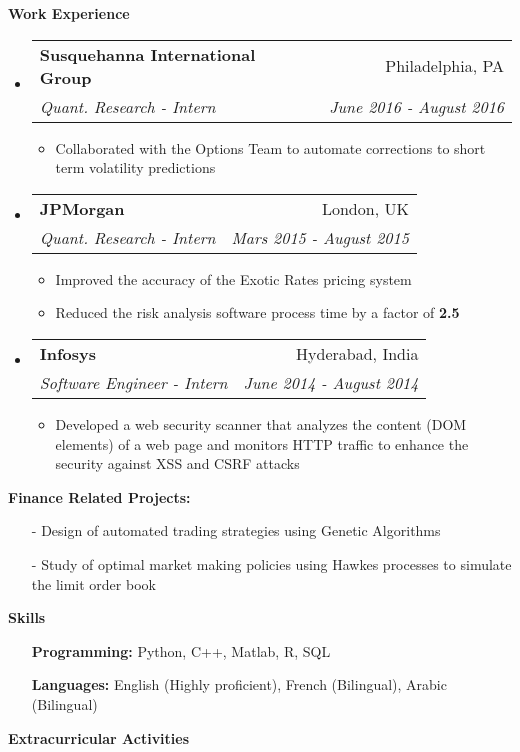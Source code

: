 \documentclass[letterpaper,11pt]{article}
\makeatletter
\newcommand{\resitem}[1]{\item #1 \vspace{-2pt}}
\newcommand{\resheading}[1]{\begin{mdframed}[backgroundcolor=gray!20] \bf{#1}  \end{mdframed}}
\newcommand{\ressubheading}[4]{
  \begin{tabular*}{6.5in}{l@{\extracolsep{\fill}}r}
    \textbf{#1} & #2 \\
    \textit{#3} & \textit{#4} \\
  \end{tabular*}\vspace{-6pt}}
\makeatother
\begin{document}
\resheading{Work Experience}
\begin{itemize}
\item
  \ressubheading{Susquehanna International Group}{Philadelphia, PA}{Quant. Research  - Intern}{June 2016 - August 2016}
  \begin{itemize}
    \resitem{Collaborated with the Options Team to automate corrections to short term volatility predictions}
  \end{itemize}
\item
  \ressubheading{JPMorgan}{London, UK}{Quant. Research - Intern}{Mars 2015 - August 2015}
  \begin{itemize}
    \resitem{Improved the accuracy of the Exotic Rates pricing system}
    \resitem{Reduced the risk analysis software process time by a factor of \textbf{2.5}}
  \end{itemize}
\item
  \ressubheading{Infosys}{Hyderabad, India}{Software Engineer - Intern}{June 2014 - August 2014}
  \begin{itemize}
    \resitem{Developed a web security scanner that analyzes the content (DOM elements) of a web page and monitors HTTP traffic to enhance the security against XSS and CSRF attacks}
  \end{itemize}
\end{itemize}

\resheading{Finance Related Projects:}
\begin{itemize}
\item[-] Design of automated trading strategies using Genetic Algorithms\vspace{-5pt}
\item[-] Study of optimal market making policies using Hawkes processes to simulate the limit order book
\end{itemize}

\resheading{Skills}
\begin{itemize}
\item[] \textbf{Programming:}  Python, C++, Matlab, R, SQL
  \vspace{-5pt}
\item[] \textbf{Languages:} English (Highly proficient), French (Bilingual),  Arabic (Bilingual)
\end{itemize}

\resheading{Extracurricular Activities}
\end{document}
